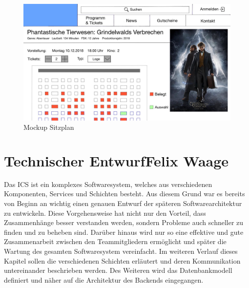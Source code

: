 		\begin{figure}[H]
			\centering 
			\includegraphics[width=14cm]{img/mockUp3.png}
			\captionsetup{format=hang}
			\caption[Mockup Sitzplan]{\label{fig:mockUpSitzplan} Mockup Sitzplan }
		\end{figure}
	
	\section[Technischer Entwurf]{Technischer Entwurf{\hfill \normalsize Felix Waage}} 	

		Das \ac{ICS} ist ein komplexes Softwaresystem, welches aus verschiedenen Komponenten, Services und Schichten besteht. Aus diesem Grund war es bereits von Beginn an wichtig einen genauen Entwurf der späteren Softwarearchitektur zu entwickeln. Diese Vorgehensweise hat nicht nur den Vorteil, dass Zusammenhänge besser verstanden werden, sondern Probleme auch schneller zu finden und zu beheben sind. Darüber hinaus wird nur so eine effektive und gute Zusammenarbeit zwischen den Teammitgliedern ermöglicht und später die Wartung des gesamten Softwaresystem vereinfacht.
		Im weiteren Verlauf dieses Kapitel sollen die verschiedenen Schichten erläutert und deren Kommunikation untereinander beschrieben werden. Des Weiteren wird das Datenbankmodell definiert und näher auf die Architektur des Backends eingegangen.
		
